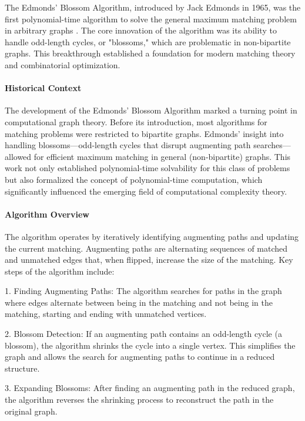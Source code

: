 The Edmonds' Blossom Algorithm, introduced by Jack Edmonds in 1965, was the first polynomial-time algorithm to solve the general maximum matching problem in arbitrary graphs \cite{edmonds1965paths}. The core innovation of the algorithm was its ability to handle odd-length cycles, or "blossoms," which are problematic in non-bipartite graphs. This breakthrough established a foundation for modern matching theory and combinatorial optimization.

\paragraph{Historical Context}
The development of the Edmonds' Blossom Algorithm marked a turning point in computational graph theory. Before its introduction, most algorithms for matching problems were restricted to bipartite graphs. Edmonds’ insight into handling blossoms—odd-length cycles that disrupt augmenting path searches—allowed for efficient maximum matching in general (non-bipartite) graphs. This work not only established polynomial-time solvability for this class of problems but also formalized the concept of polynomial-time computation, which significantly influenced the emerging field of computational complexity theory.

\paragraph{Algorithm Overview}
The algorithm operates by iteratively identifying augmenting paths and updating the current matching. Augmenting paths are alternating sequences of matched and unmatched edges that, when flipped, increase the size of the matching. Key steps of the algorithm include:

1. Finding Augmenting Paths: 
   The algorithm searches for paths in the graph where edges alternate between being in the matching and not being in the matching, starting and ending with unmatched vertices.
   
2. Blossom Detection: 
   If an augmenting path contains an odd-length cycle (a blossom), the algorithm shrinks the cycle into a single vertex. This simplifies the graph and allows the search for augmenting paths to continue in a reduced structure.

3. Expanding Blossoms:
   After finding an augmenting path in the reduced graph, the algorithm reverses the shrinking process to reconstruct the path in the original graph.

